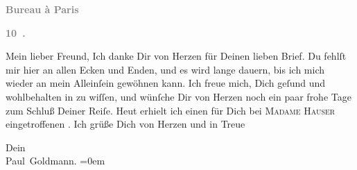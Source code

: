 \pstart
           \begin{otherlanguage}{french}\textcolor{gray}{\textbf{\textbf{Bureau à Paris}}}\end{otherlanguage}\pend
           
\pstart
           \begin{otherlanguage}{french}\textcolor{gray}{\textbf{\textbf{10 .}}}\end{otherlanguage}\pend
           
\pstart\center{}Mein lieber Freund,\pend\vspace{0.5em}
\pstart
           Ich danke Dir von Herzen für Deinen lieben Brief. Du fehlſt mir hier an allen Ecken
               und Enden, und es wird lange dauern, bis ich mich wieder an mein Alleinſein gewöhnen
               kann. Ich freue mich, Dich geſund und wohlbehalten in \label{K_L02813-1v}\label{K_L02813-1} zu wiſſen, und wünſche Dir von Herzen
               noch ein paar frohe Tage zum Schluß Deiner Reiſe. Heut
               erhielt ich einen für Dich bei \textsc{Madame Hauser} eingetroffenen \label{K_L02813-2v}\label{K_L02813-2}. Ich grüße Dich von Herzen und in
               Treue\pend
           
\pstart
           Dein {\\[\baselineskip]}\spacefill\mbox{Paul Goldmann.}\pend
           \leftskip=0em{}\endnumbering{}  
      